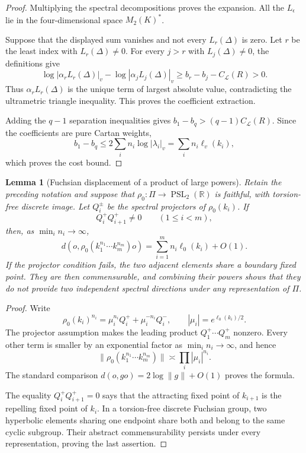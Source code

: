 \documentclass[11pt,reqno]{amsart}
\newtheorem{lemma}[theorem]{Lemma}
\theoremstyle{definition}
\theoremstyle{remark}
\newcommand{\R}{\mathbb R}
\newcommand{\PSL}{\operatorname{PSL}}
\begin{document}
\begin{proof}
Multiplying the spectral decompositions proves the expansion.  All the
\(L_\epsilon\) lie in the four-dimensional space \(M_2(K)^*\).

Suppose that the displayed sum vanishes and not every
\(L_r(\Delta)\) is zero.  Let \(r\) be the least index with
\(L_r(\Delta)\ne0\).  For every \(j>r\) with
\(L_j(\Delta)\ne0\), the definitions give
\[
 \log|\alpha_rL_r(\Delta)|_v-
 \log|\alpha_jL_j(\Delta)|_v
 \ge b_r-b_j-C_{\mathcal L}(R)>0.
\]
Thus \(\alpha_rL_r(\Delta)\) is the unique term of largest absolute
value, contradicting the ultrametric triangle inequality.  This proves the
coefficient extraction.

Adding the \(q-1\) separation inequalities gives
\(b_1-b_q>(q-1)C_{\mathcal L}(R)\).  Since the coefficients are pure
Cartan weights,
\[
 b_1-b_q\le
 2\sum_i n_i\log|\lambda_i|_v
 =\sum_i n_i\ell_v(k_i),
\]
which proves the cost bound.
\end{proof}

\begin{lemma}[Fuchsian displacement of a product of large powers]
\label{lem:visible-power-cost}
Retain the preceding notation and suppose that
\(\rho_0\colon\Pi\to\PSL_2(\R)\) is faithful, with torsion-free discrete
image.  Let
\(Q_i^\pm\) be the spectral projectors of \(\rho_0(k_i)\).  If
\[
 Q_i^+Q_{i+1}^+\ne0\qquad(1\le i<m),
\]
then, as \(\min_i n_i\to\infty\),
\[
 d\!\left(o,\rho_0(k_1^{n_1}\cdots k_m^{n_m})o\right)
 =\sum_{i=1}^m n_i\ell_0(k_i)+O(1).
\]
If the projector condition fails, the two adjacent elements share a
boundary fixed point.  They are then commensurable, and combining their
powers shows that they do not provide two independent spectral directions
under any representation of \(\Pi\).
\end{lemma}

\begin{proof}
Write
\[
 \rho_0(k_i)^{n_i}
 =\mu_i^{n_i}Q_i^++\mu_i^{-n_i}Q_i^-,
 \qquad |\mu_i|=e^{\ell_0(k_i)/2}.
\]
The projector assumption makes the leading product
\(Q_1^+\cdots Q_m^+\) nonzero.  Every other term is smaller by an
exponential factor as \(\min_i n_i\to\infty\), and hence
\[
 \bigl\|\rho_0(k_1^{n_1}\cdots k_m^{n_m})\bigr\|
 \asymp\prod_i|\mu_i|^{n_i}.
\]
The standard comparison
\(d(o,go)=2\log\|g\|+O(1)\) proves the formula.

The equality \(Q_i^+Q_{i+1}^+=0\) says that the attracting fixed point of
\(k_{i+1}\) is the repelling fixed point of \(k_i\).  In a torsion-free
discrete Fuchsian group, two hyperbolic elements sharing one endpoint share
both and belong to the same cyclic subgroup.  Their abstract
commensurability persists under every representation, proving the last
assertion.
\end{proof}
\end{document}
